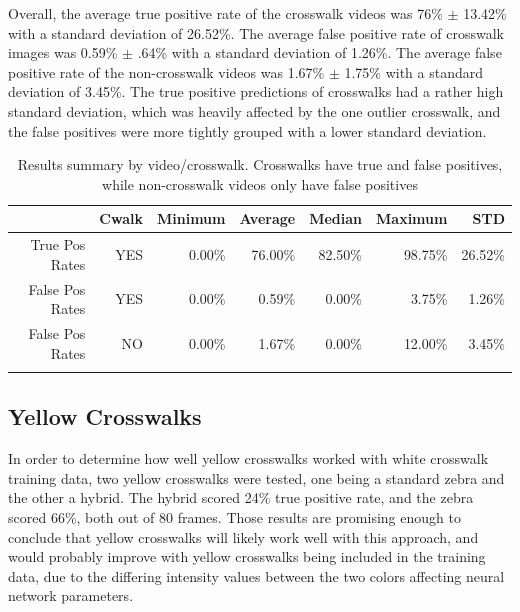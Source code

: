 \documentclass[12pt]{ucthesis}
\begin{document}
Overall, the average true positive rate of the crosswalk videos was 76\% $\pm$ 13.42\% with a standard deviation of 26.52\%. The average false positive rate of crosswalk images was 0.59\% $\pm$ .64\% with a standard deviation of 1.26\%. The average false positive rate of the non-crosswalk videos was 1.67\% $\pm$ 1.75\% with a standard deviation of 3.45\%.
The true positive predictions of crosswalks had a rather high standard deviation, which was heavily affected by the one outlier crosswalk, and the false positives were more tightly grouped with a lower standard deviation.

\begin{table}[t]
    \begin{longtable}{|r|r|r|r|r|r|r|}
    \hline
          & Cwalk & Minimum & Average & Median & Maximum & STD \bigstrut\\
    \hline
    True Pos Rates & YES   & 0.00\% & 76.00\% & 82.50\% & 98.75\% & 26.52\% \bigstrut\\
    \hline
    False Pos Rates & YES   & 0.00\% & 0.59\% & 0.00\% & 3.75\% & 1.26\% \bigstrut\\
    \hline
    False Pos Rates & NO    & 0.00\% & 1.67\% & 0.00\% & 12.00\% & 3.45\% \bigstrut\\
    \hline


    \caption[Results summary by video/crosswalk]{Results summary by video/crosswalk. Crosswalks have true and false positives, while non-crosswalk videos only have false positives}
    \label{tab:crosswalkResultsSummary} 
    \end{longtable}
\end{table}



\subsection{Yellow Crosswalks}

In order to determine how well yellow crosswalks worked with white crosswalk training data, two yellow crosswalks were tested, one being a standard zebra and the other a hybrid. The hybrid scored 24\% true positive rate, and the zebra scored 66\%, both out of 80 frames. Those results are promising enough to conclude that yellow crosswalks will likely work well with this approach, and would probably improve with yellow crosswalks being included in the training data, due to the differing intensity values between the two colors affecting neural network parameters. 
\end{document}
